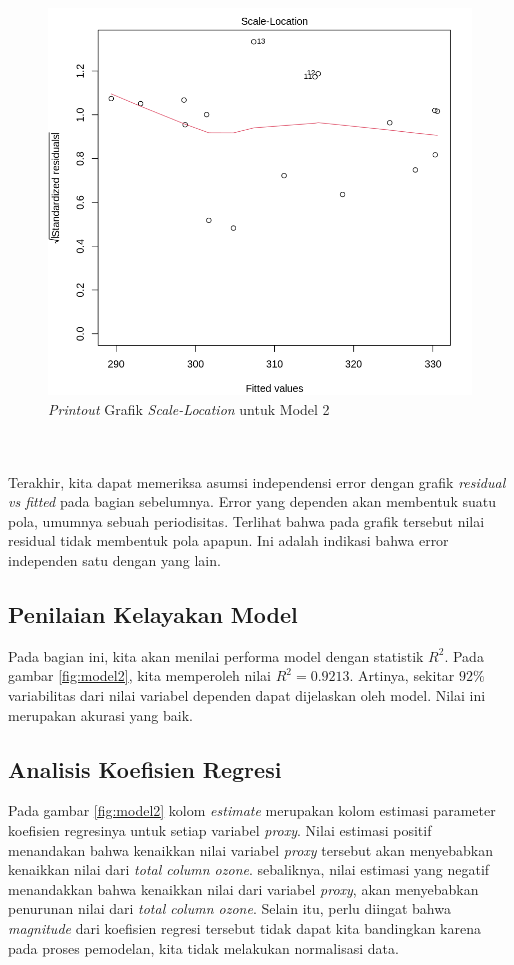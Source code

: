 \begin{enumerate}
\begin{figure}[h!]
    \centering
    \includegraphics[scale=0.5]{src/Pics/homoscedasticity.png}
    \caption{\textit{Printout} Grafik \textit{Scale-Location} untuk Model 2}
\end{figure}
\\~\\
Terakhir, kita dapat memeriksa asumsi independensi error dengan grafik \textit{residual vs fitted} pada bagian sebelumnya. Error yang dependen akan membentuk suatu pola, umumnya sebuah periodisitas. Terlihat bahwa pada grafik tersebut nilai residual tidak membentuk pola apapun. Ini adalah indikasi bahwa error independen satu dengan yang lain.
\subsection{Penilaian Kelayakan Model}
Pada bagian ini, kita akan menilai performa model dengan statistik $R^2$. Pada gambar \ref{fig:model2}, kita memperoleh nilai $R^2 = 0.9213$. Artinya, sekitar $92\%$ variabilitas dari nilai variabel dependen dapat dijelaskan oleh model. Nilai ini merupakan akurasi yang baik.

\subsection{Analisis Koefisien Regresi}
Pada gambar \ref{fig:model2} kolom \textit{estimate} merupakan kolom estimasi parameter koefisien regresinya untuk setiap variabel \textit{proxy}. Nilai estimasi positif menandakan bahwa kenaikkan nilai variabel \textit{proxy} tersebut akan menyebabkan kenaikkan nilai dari \textit{total column ozone}. sebaliknya, nilai estimasi yang negatif menandakkan bahwa kenaikkan nilai dari variabel \textit{proxy}, akan  menyebabkan penurunan nilai dari \textit{total column ozone}. Selain itu, perlu diingat bahwa \textit{magnitude} dari koefisien regresi tersebut tidak dapat kita bandingkan karena pada proses pemodelan, kita tidak melakukan normalisasi data.


\end{enumerate}
